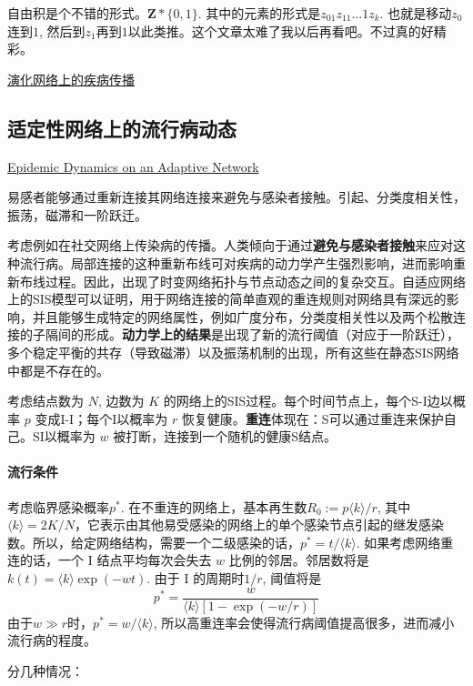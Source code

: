 自由积是个不错的形式。$\mathbf{Z}*\{0,1\}$. 其中的元素的形式是$z_01z_11\dots 1z_k$. 也就是移动$z_0$连到$1$, 然后到$z_1$再到$1$以此类推。这个文章太难了我以后再看吧。不过真的好精彩。

\href{https://journals.aps.org/pre/pdf/10.1103/PhysRevE.82.036112}{演化网络上的疾病传播}

\subsection{适定性网络上的流行病动态}
\href{https://journals.aps.org/prl/abstract/10.1103/PhysRevLett.96.208701}{Epidemic Dynamics on an Adaptive Network}

易感者能够通过重新连接其网络连接来避免与感染者接触。引起、分类度相关性，振荡，磁滞和一阶跃迁。

考虑例如在社交网络上传染病的传播。人类倾向于通过\textbf{避免与感染者接触}来应对这种流行病。局部连接的这种重新布线可对疾病的动力学产生强烈影响，进而影响重新布线过程。因此，出现了时变网络拓扑与节点动态之间的复杂交互。自适应网络上的SIS模型可以证明，用于网络连接的简单直观的重连规则对网络具有深远的影响，并且能够生成特定的网络属性，例如广度分布，分类度相关性以及两个松散连接的子隔间的形成。\textbf{动力学上的结果}是出现了新的流行阈值（对应于一阶跃迁），多个稳定平衡的共存（导致磁滞）以及振荡机制的出现，所有这些在静态SIS网络中都是不存在的。

考虑结点数为 $N$, 边数为 $K$ 的网络上的SIS过程。每个时间节点上，每个S-I边以概率 $p$ 变成I-I；每个I以概率为 $r$  恢复健康。\textbf{重连}体现在：S可以通过重连来保护自己。SI以概率为 $w$ 被打断，连接到一个随机的健康S结点。

\paragraph{流行条件}考虑临界感染概率$p^*$. 在不重连的网络上，基本再生数$R_{0}:=p\langle k\rangle / r$, 其中 $\langle k\rangle=2 K / N$，它表示由其他易受感染的网络上的单个感染节点引起的继发感染数。所以，给定网络结构，需要一个二级感染的话，$p^* = t/\langle k \rangle$. 如果考虑网络重连的话，一个 I 结点平均每次会失去 $w$ 比例的邻居。邻居数将是 $k(t)=\langle k\rangle \exp (-w t)$. 由于 I 的周期时$1/r$, 阈值将是\begin{equation}
    p^{*}=\frac{w}{\langle k\rangle[1-\exp (-w / r)]}\label{eq:rewire_threshold}
\end{equation}
由于$w\gg r$时，$p^* = w/\langle k\rangle$, 所以高重连率会使得流行病阈值提高很多，进而减小流行病的程度。

分几种情况：

